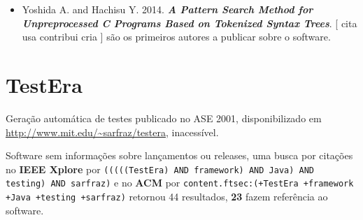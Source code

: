 \begin{itemize}
\item Yoshida A. and Hachisu Y.
      2014.
        \textbf{\textit{ A Pattern Search Method for Unpreprocessed C Programs Based on Tokenized Syntax Trees}}.
      [
          cita
          usa
          contribui
          cria
      ]
são os primeiros autores a publicar sobre o software.
\end{itemize}
\section{TestEra}

Geração automática de testes
publicado no ASE 2001,
disponibilizado em \url{http://www.mit.edu/~sarfraz/testera},
inacessível.

Software sem informações sobre lançamentos ou releases,
uma busca por citações no {\bf IEEE Xplore} por
\texttt{(((((TestEra) AND framework) AND Java) AND testing) AND sarfraz)}
e no {\bf ACM} por
\texttt{content.ftsec:(+TestEra +framework +Java +testing +sarfraz)}
retornou
44 resultados,
{\bf 23} fazem referência ao software.


